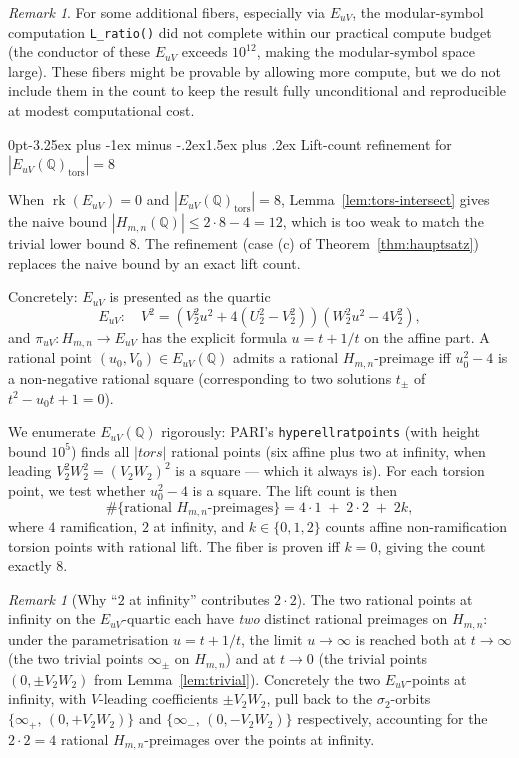 \documentclass[12pt,a4paper,reqno]{amsart}
\makeatletter
\renewcommand{\subsection}{\@startsection{subsection}{2}%
  {0pt}{-3.25ex plus -1ex minus -.2ex}{1.5ex plus .2ex}%
  {\normalfont\normalsize\bfseries}}
\theoremstyle{plain}
\theoremstyle{definition}
\theoremstyle{remark}
\newtheorem{remark}[theorem]{Remark}
\newcommand{\Q}{\mathbb{Q}}
\newcommand{\HC}{H_{m,n}}
\newcommand{\rk}{\operatorname{rk}}
\newcommand{\tors}{\mathrm{tors}}
\makeatother
\begin{document}
\begin{remark}
For some additional fibers, especially via $E_{uV}$, the modular-symbol computation \texttt{L\_ratio()} did not complete within our practical compute budget (the conductor of these $E_{uV}$ exceeds $10^{12}$, making the modular-symbol space large). These fibers might be provable by allowing more compute, but we do not include them in the count to keep the result fully unconditional and reproducible at modest computational cost.
\end{remark}

\subsection{Lift-count refinement for $|E_{uV}(\Q)_\tors| = 8$}
\label{ssec:lift-refinement}

When $\rk(E_{uV}) = 0$ and $|E_{uV}(\Q)_\tors| = 8$, Lemma~\ref{lem:tors-intersect} gives the naive bound $|\HC(\Q)| \le 2 \cdot 8 - 4 = 12$, which is too weak to match the trivial lower bound $8$. The refinement (case (c) of Theorem~\ref{thm:hauptsatz}) replaces the naive bound by an exact lift count.

Concretely: $E_{uV}$ is presented as the quartic
$$
E_{uV}: \quad V^2 = (V_2^2 u^2 + 4(U_2^2 - V_2^2))(W_2^2 u^2 - 4 V_2^2),
$$
and $\pi_{uV}: \HC \to E_{uV}$ has the explicit formula $u = t + 1/t$ on the affine part. A rational point $(u_0, V_0) \in E_{uV}(\Q)$ admits a rational $\HC$-preimage iff $u_0^2 - 4$ is a non-negative rational square (corresponding to two solutions $t_\pm$ of $t^2 - u_0 t + 1 = 0$).

We enumerate $E_{uV}(\Q)$ rigorously: PARI's \texttt{hyperellratpoints} (with height bound $10^5$) finds all $|tors|$ rational points (six affine plus two at infinity, when leading $V_2^2 W_2^2 = (V_2 W_2)^2$ is a square --- which it always is). For each torsion point, we test whether $u_0^2 - 4$ is a square. The lift count is then
$$
\#\{\text{rational $\HC$-preimages}\} = 4 \cdot 1 \;+\; 2 \cdot 2 \;+\; 2 k,
$$
where $4$ ramification, $2$ at infinity, and $k \in \{0, 1, 2\}$ counts affine non-ramification torsion points with rational lift. The fiber is proven iff $k = 0$, giving the count exactly $8$.

\begin{remark}[Why ``$2$ at infinity'' contributes $2 \cdot 2$]
The two rational points at infinity on the $E_{uV}$-quartic each have
\emph{two} distinct rational preimages on $\HC$: under the parametrisation
$u = t + 1/t$, the limit $u \to \infty$ is reached both at $t \to \infty$
(the two trivial points $\infty_\pm$ on $\HC$) and at $t \to 0$ (the trivial
points $(0, \pm V_2 W_2)$ from Lemma~\ref{lem:trivial}). Concretely the two
$E_{uV}$-points at infinity, with $V$-leading coefficients $\pm V_2 W_2$,
pull back to the $\sigma_2$-orbits
$\{\infty_+, \, (0, +V_2 W_2)\}$ and
$\{\infty_-, \, (0, -V_2 W_2)\}$ respectively, accounting for the
$2 \cdot 2 = 4$ rational $\HC$-preimages over the points at infinity.
\end{remark}
\end{document}
